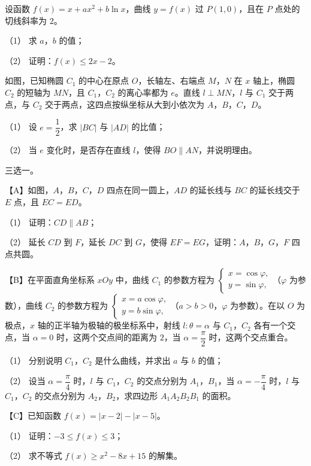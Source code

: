 \begin{question}
设函数 $f(x)=x+ax^2+b\ln x$，曲线 $y=f(x)$ 过 $P(1,0)$，且在 $P$ 点处的切线斜率为 $2$。

（1） 求 $a$，$b$ 的值；

（2） 证明：$f(x)\leqslant2x-2$。

\Needspace{0.4\textheight}
\end{question}
\begin{question}
如图，已知椭圆 $C_1$ 的中心在原点 $O$，长轴左、右端点 $M$，$N$ 在 $x$ 轴上，椭圆 $C_2$ 的短轴为 $MN$，且 $C_1$，$C_2$ 的离心率都为 $e$。直线 $l\perp MN$，$l$ 与 $C_1$ 交于两点，与 $C_2$ 交于两点，这四点按纵坐标从大到小依次为 $A$，$B$，$C$，$D$。

（1） 设 $e=\dfrac12$，求 $|BC|$ 与 $|AD|$ 的比值；

（2） 当 $e$ 变化时，是否存在直线 $l$，使得 $BO\parallel AN$，并说明理由。
\nopagebreak[4]
\begin{center}\end{center}
\nopagebreak[4]
\Needspace{0.4\textheight}
\end{question}
\begin{question}
三选一。

【A】如图，$A$，$B$，$C$，$D$ 四点在同一圆上，$AD$ 的延长线与 $BC$ 的延长线交于 $E$ 点，且 $EC=ED$。

（1） 证明：$CD\parallel AB$；

（2） 延长 $CD$ 到 $F$，延长 $DC$ 到 $G$，使得 $EF=EG$，证明：$A$，$B$，$G$，$F$ 四点共圆。
\nopagebreak[4]
\begin{center}\end{center}
\nopagebreak[4]
【B】在平面直角坐标系 $xOy$ 中，曲线 $C_1$ 的参数方程为 $\begin{cases}x=\cos\varphi,\\y=\sin\varphi,\end{cases}$（$\varphi$ 为参数），曲线 $C_2$ 的参数方程为 $\begin{cases}x=a\cos\varphi,\\y=b\sin\varphi,\end{cases}$（$a>b>0$，$\varphi$ 为参数）。在以 $O$ 为极点，$x$ 轴的正半轴为极轴的极坐标系中，射线 $l:\theta=\alpha$ 与 $C_1$，$C_2$ 各有一个交点，当 $\alpha=0$ 时，这两个交点间的距离为 $2$，当 $\alpha=\dfrac\pi2$ 时，这两个交点重合。

（1） 分别说明 $C_1$，$C_2$ 是什么曲线，并求出 $a$ 与 $b$ 的值；

（2） 设当 $\alpha=\dfrac\pi4$ 时，$l$ 与 $C_1$，$C_2$ 的交点分别为 $A_1$，$B_1$，当 $\alpha=-\dfrac\pi4$ 时，$l$ 与 $C_1$，$C_2$ 的交点分别为 $A_2$，$B_2$，求四边形 $A_1A_2B_2B_1$ 的面积。

【C】已知函数 $f(x)=|x-2|-|x-5|$。

（1） 证明：$-3\leqslant f(x)\leqslant3$；

（2） 求不等式 $f(x)\geqslant x^2-8x+15$ 的解集。

\end{question}